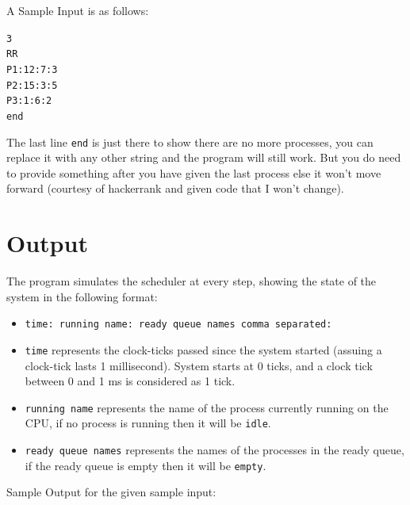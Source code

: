 \documentclass{article}
\theoremstyle{mytheoremstyle}
\theoremstyle{mytheoremstyle}
\theoremstyle{myproblemstyle}
\begin{document}
\noindent A Sample Input is as follows:

\vspace*{2mm}
\noindent\texttt{3} \\
\texttt{RR} \\
\texttt{P1:12:7:3} \\
\texttt{P2:15:3:5} \\
\texttt{P3:1:6:2} \\
\texttt{end} \vspace*{3mm}

The last line \texttt{end} is just there to show there are no more processes, you can replace it with any other string and the program will still work. But you do need to provide something after you have given the last process else it won't move forward (courtesy of hackerrank and given code that I won't change).

\newpage
\section{Output}
The program simulates the scheduler at every step, showing the state of the system in the following format: \vspace*{-2mm}
\begin{itemize}
  \item[]\hspace*{-3.25mm}\texttt{time: running name: ready queue names comma separated:}
  \item \texttt{time} represents the clock-ticks passed since the system started (assuing a clock-tick lasts 1 millisecond). System starts at 0 ticks, and a clock tick between 0 and 1 ms is considered as 1 tick.
  \item \texttt{running name} represents the name of the process currently running on the CPU, if no process is running then it will be \texttt{idle}.
  \item \texttt{ready queue names} represents the names of the processes in the ready queue, if the ready queue is empty then it will be \texttt{empty}.
\end{itemize}

\noindent Sample Output for the given sample input:
\end{document}
